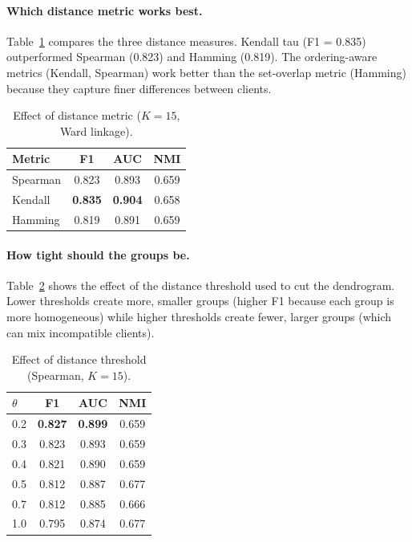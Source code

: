 \documentclass[12pt,a4paper]{article}
\begin{document}
\paragraph{Which distance metric works best.} Table~\ref{tab:ablation_metric} compares the three distance measures. Kendall tau (F1 = 0.835) outperformed Spearman (0.823) and Hamming (0.819). The ordering-aware metrics (Kendall, Spearman) work better than the set-overlap metric (Hamming) because they capture finer differences between clients.

\begin{table}[H]
\centering
\caption{Effect of distance metric ($K=15$, Ward linkage).}\label{tab:ablation_metric}
\begin{tabular}{lccc}
\toprule
\textbf{Metric} & \textbf{F1} & \textbf{AUC} & \textbf{NMI} \\
\midrule
Spearman & 0.823 & 0.893 & 0.659 \\
Kendall  & \textbf{0.835} & \textbf{0.904} & 0.658 \\
Hamming  & 0.819 & 0.891 & 0.659 \\
\bottomrule
\end{tabular}
\end{table}

\paragraph{How tight should the groups be.} Table~\ref{tab:ablation_threshold} shows the effect of the distance threshold used to cut the dendrogram. Lower thresholds create more, smaller groups (higher F1 because each group is more homogeneous) while higher thresholds create fewer, larger groups (which can mix incompatible clients).

\begin{table}[H]
\centering
\caption{Effect of distance threshold (Spearman, $K=15$).}\label{tab:ablation_threshold}
\begin{tabular}{lccc}
\toprule
$\theta$ & \textbf{F1} & \textbf{AUC} & \textbf{NMI} \\
\midrule
0.2 & \textbf{0.827} & \textbf{0.899} & 0.659 \\
0.3 & 0.823 & 0.893 & 0.659 \\
0.4 & 0.821 & 0.890 & 0.659 \\
0.5 & 0.812 & 0.887 & 0.677 \\
0.7 & 0.812 & 0.885 & 0.666 \\
1.0 & 0.795 & 0.874 & 0.677 \\
\bottomrule
\end{tabular}
\end{table}
\end{document}
